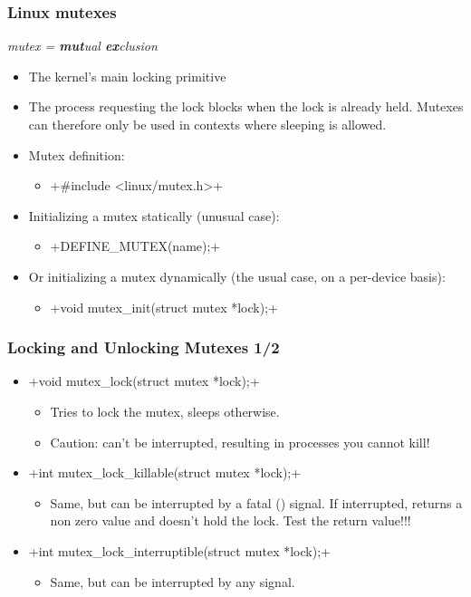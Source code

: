 \begin{frame}[fragile]
  \frametitle{Linux mutexes}
  {\em mutex = {\bf mut}ual {\bf ex}clusion}
  \begin{itemize}
  \item The kernel's main locking primitive
  \item The process requesting the lock blocks when the lock is
    already held.  Mutexes can therefore only be used in contexts
    where sleeping is allowed.
  \item Mutex definition:
    \begin{itemize}
    \item {}+#include <linux/mutex.h>+
    \end{itemize}
  \item Initializing a mutex statically (unusual case):
    \begin{itemize}
    \item {}+DEFINE_MUTEX(name);+
    \end{itemize}
  \item Or initializing a mutex dynamically (the usual case, on a per-device basis):
    \begin{itemize}
    \item {}+void mutex_init(struct mutex *lock);+
    \end{itemize}
  \end{itemize}
\end{frame}

\begin{frame}[fragile]
  \frametitle{Locking and Unlocking Mutexes 1/2}
  \begin{itemize}
  \item {}+void mutex_lock(struct mutex *lock);+
    \begin{itemize}
    \item Tries to lock the mutex, sleeps otherwise.
    \item Caution: can't be interrupted, resulting in processes you
      cannot kill!
    \end{itemize}
  \item {}+int mutex_lock_killable(struct mutex *lock);+
    \begin{itemize}
    \item Same, but can be interrupted by a fatal () signal. If
      interrupted, returns a non zero value and doesn't hold the
      lock. Test the return value!!!
    \end{itemize}
  \item {}+int mutex_lock_interruptible(struct mutex *lock);+
    \begin{itemize}
    \item Same, but can be interrupted by any signal.
    \end{itemize}
  \end{itemize}
\end{frame}

